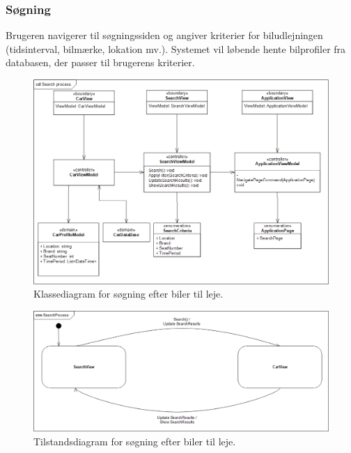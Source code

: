 \documentclass[Rapport/Rapport_main.tex]{subfiles}
\begin{document}
\subsubsection{Søgning}
Brugeren navigerer til søgningssiden og angiver kriterier for biludlejningen (tidsinterval, bilmærke, lokation mv.). Systemet vil løbende hente bilprofiler fra databasen, der passer til brugerens kriterier. 
\begin{figure}[H]
    \centering
    \includegraphics[width=1\textwidth]{Arkitektur/Softwarearkitektur/Searching/graphics/SearchProcessCD.png}
    \caption{Klassediagram for søgning efter biler til leje. }
    \label{fig:SearchProcessCD}
\end{figure}
\begin{figure}[H]
    \centering
    \includegraphics[width=1\textwidth]{Arkitektur/Softwarearkitektur/Searching/graphics/SearchProcessSTM.png}
    \caption{Tilstandsdiagram for søgning efter biler til leje. }
    \label{fig:SearchProcessSTM}
\end{figure}
\end{document}
